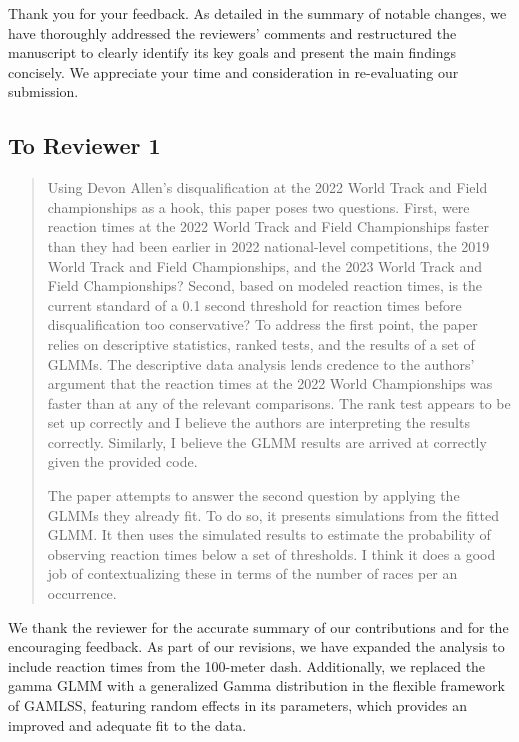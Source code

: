 \documentclass[12pt]{article}
\newenvironment{comment}%
{\begin{quotation}\noindent\small\it\color{darkblue}\ignorespaces%
}{\end{quotation}}
\begin{document}
Thank you for your feedback. As detailed in the summary of notable changes,
we have thoroughly addressed the reviewers' comments and restructured the
manuscript to clearly identify its key goals and present the main findings
concisely. We appreciate your time and consideration in re-evaluating our
submission.

\subsection*{To Reviewer 1}

\begin{comment}
Using Devon Allen's disqualification at the 2022 World Track and Field
championships as a hook, this paper poses two questions. First, were reaction
times at the 2022 World Track and Field Championships faster than they had been
earlier in 2022 national-level competitions, the 2019 World Track and Field
Championships, and the 2023 World Track and Field Championships? Second, based
on modeled reaction times, is the current standard of a 0.1 second threshold
for reaction times before disqualification too conservative? To
address the first point, the paper relies on descriptive statistics, ranked
tests, and the results of a set of GLMMs. The descriptive data analysis lends
credence to the authors' argument that the reaction times at the 2022 World
Championships was faster than at any of the relevant comparisons. The rank test
appears to be set up correctly and I believe the authors are interpreting the
results correctly. Similarly, I believe the GLMM results are arrived at
correctly given the provided code.

The paper attempts to answer the second question by applying the GLMMs they
already fit. To do so, it presents simulations from the fitted GLMM. It then
uses the simulated results to estimate the probability of observing reaction
times below a set of thresholds. I think it does a good job of contextualizing
these in terms of the number of races per an occurrence.
\end{comment}

We thank the reviewer for the accurate summary of our contributions
and for the encouraging feedback. As part of our revisions, we have
expanded the analysis to include reaction times from the 100-meter
dash. Additionally, we replaced the gamma GLMM with a generalized
Gamma distribution in the flexible framework of GAMLSS,  featuring
random effects in its parameters, which provides an improved and
adequate fit to the data.
\end{document}
